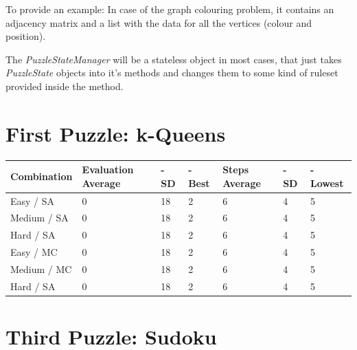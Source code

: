 \documentclass{scrartcl}
\begin{document}
To provide an example: In case of the graph colouring problem, it contains an adjacency matrix and a list with the data for all the vertices (colour and position).

The \textit{PuzzleStateManager} will be a stateless object in most cases, that just takes \textit{PuzzleState} objects into it's methods and changes them to some kind of ruleset provided inside the method.

\section{First Puzzle: k-Queens}

\begin{tabularx}{\textwidth}{l | X | X | X | X | X | X}
Combination & Evaluation  \newline Average & - \newline SD & - \newline Best & Steps \newline Average & - \newline SD & - \newline Lowest \\
\hline
Easy / SA & 0 & 18 & 2 & 6 & 4 & 5 \\
Medium / SA & 0 & 18 & 2 & 6 & 4 & 5  \\
Hard / SA & 0 & 18 & 2 & 6 & 4 & 5  \\
Easy / MC & 0 & 18 & 2 & 6 & 4 & 5  \\
Medium / MC & 0 & 18 & 2 & 6 & 4 & 5  \\
Hard / SA & 0 & 18 & 2 & 6 & 4 & 5  \\
\end{tabularx}

\section{Third Puzzle: Sudoku}
\end{document}
